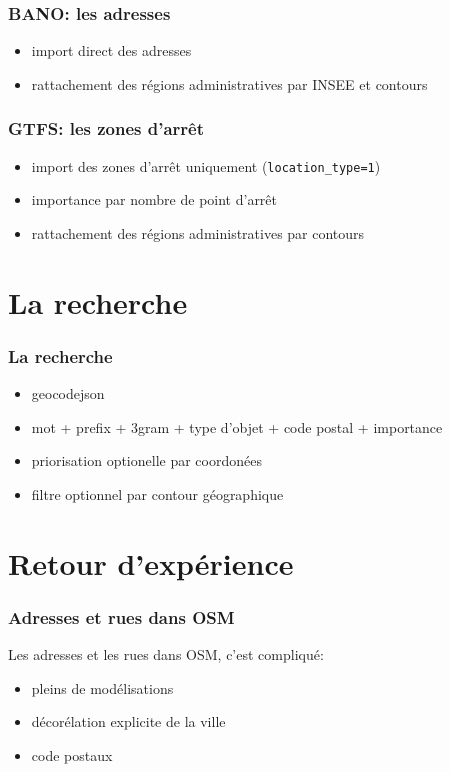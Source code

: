 \documentclass[table]{beamer}
\begin{document}
\begin{frame}
  \frametitle{BANO: les adresses}

  \begin{itemize}
  \item import direct des adresses
  \item rattachement des régions administratives par INSEE et contours
  \end{itemize}
\end{frame}

\begin{frame}
  \frametitle{GTFS: les zones d'arrêt}

  \begin{itemize}
  \item import des zones d'arrêt uniquement (\texttt{location\_type=1})
  \item importance par nombre de point d'arrêt
  \item rattachement des régions administratives par contours
  \end{itemize}
\end{frame}

\section{La recherche}

\begin{frame}
  \frametitle{La recherche}

  \begin{itemize}
  \item geocodejson
  \item mot + prefix + 3gram + type d'objet + code postal + importance
  \item priorisation optionelle par coordonées
  \item filtre optionnel par contour géographique
  \end{itemize}
\end{frame}

\section{Retour d'expérience}

\begin{frame}
  \frametitle{Adresses et rues dans OSM}

  Les adresses et les rues dans OSM, c'est compliqué:
  \begin{itemize}
  \item pleins de modélisations
  \item décorélation explicite de la ville
  \item code postaux
  \end{itemize}
\end{frame}
\end{document}
